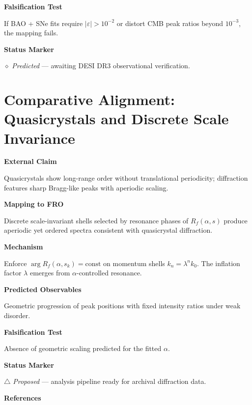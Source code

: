 \textbf{Falsification Test}

If BAO + SNe fits require $|\varepsilon|>10^{-2}$ or distort CMB peak ratios beyond $10^{-3}$, the mapping fails.

\textbf{Status Marker}

$\diamond$ \textit{Predicted} --- awaiting DESI DR3 observational verification.

\section{Comparative Alignment: Quasicrystals and Discrete Scale Invariance}

\textbf{External Claim}

Quasicrystals show long-range order without translational periodicity; diffraction features sharp Bragg-like peaks with aperiodic scaling.

\textbf{Mapping to FRO}

Discrete scale-invariant shells selected by resonance phases of $R_f(\alpha,s)$ produce aperiodic yet ordered spectra consistent with quasicrystal diffraction.

\textbf{Mechanism}

Enforce $\arg R_f(\alpha,s_k)=\text{const}$ on momentum shells $k_n=\lambda^n k_0$. The inflation factor $\lambda$ emerges from $\alpha$-controlled resonance.

\textbf{Predicted Observables}

Geometric progression of peak positions with fixed intensity ratios under weak disorder.

\textbf{Falsification Test}

Absence of geometric scaling predicted for the fitted $\alpha$.

\textbf{Status Marker}

$\triangle$ \textit{Proposed} --- analysis pipeline ready for archival diffraction data.

\textbf{References}

\cite{shechtman1984metallic,senechal1995quasicrystals}

